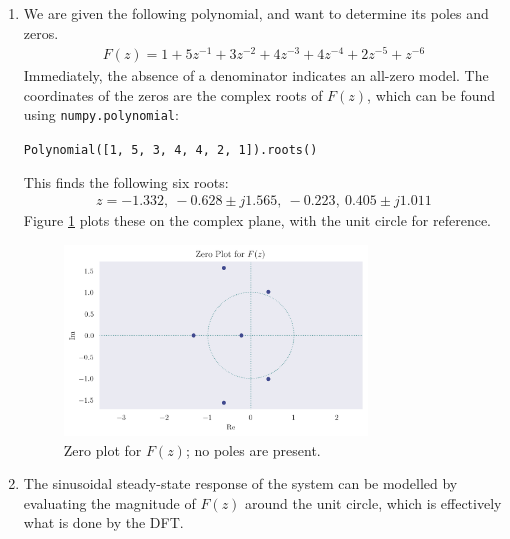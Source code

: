 \documentclass[a4paper, 11pt]{article}
\begin{document}
\begin{enumerate}[label=\alph*)]

    \item We are given the following polynomial, and want to determine its poles
    and zeros.
    \begin{align*}
        F(z) = 1 + 5z^{-1} + 3z^{-2} + 4z^{-3} + 4z^{-4} + 2z^{-5} + z^{-6}
    \end{align*}
    Immediately, the absence of a denominator indicates an all-zero model. The
    coordinates of the zeros are the complex roots of $F(z)$, which can be found
    using \texttt{numpy.polynomial}:
    \begin{center}
        \texttt{Polynomial([1, 5, 3, 4, 4, 2, 1]).roots()}
    \end{center}
    This finds the following six roots:
    \begin{align*}
        z = -1.332,\ -0.628\pm j1.565,\ -0.223,\ 0.405\pm j1.011
    \end{align*}
    Figure \ref{fig:q5a_polezero} plots these on the complex plane, with the unit
    circle for reference.
    \begin{figure}[ht]
        \centering
        \includegraphics[width=0.76\textwidth]{images/q5a_polezero.png}
        \caption{Zero plot for $F(z)$; no poles are present.}
        \label{fig:q5a_polezero}
    \end{figure}

    \item The sinusoidal steady-state response of the system can be modelled by
    evaluating the magnitude of $F(z)$ around the unit circle, which is
    effectively what is done by the DFT.


\end{enumerate}
\end{document}
